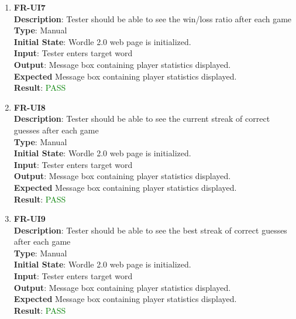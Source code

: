 \documentclass[12pt, titlepage]{article}
\begin{document}
\begin{enumerate}
	\item \textbf{FR-UI7\\}
	\textbf{Description}: Tester should be able to see the win/loss ratio after each game\\
	\textbf{Type}: Manual\\
	\textbf{Initial State}: Wordle 2.0 web page is initialized.\\
	\textbf{Input}: Tester enters target word\\
	\textbf{Output}: Message box containing player statistics displayed.\\
	\textbf{Expected} Message box containing player statistics displayed.\\
	\textbf{Result}: \textcolor{green}{PASS}\\
	
	\item \textbf{FR-UI8\\}
	\textbf{Description}: Tester should be able to see the current streak of correct guesses after each game\\
	\textbf{Type}: Manual\\
	\textbf{Initial State}: Wordle 2.0 web page is initialized.\\
	\textbf{Input}: Tester enters target word\\
	\textbf{Output}: Message box containing player statistics displayed.\\
	\textbf{Expected} Message box containing player statistics displayed.\\
	\textbf{Result}: \textcolor{green}{PASS}\\
	
	\item \textbf{FR-UI9\\}
	\textbf{Description}: Tester should be able to see the best streak of correct guesses after each game\\
	\textbf{Type}: Manual\\
	\textbf{Initial State}: Wordle 2.0 web page is initialized.\\
	\textbf{Input}: Tester enters target word\\
	\textbf{Output}: Message box containing player statistics displayed.\\
	\textbf{Expected} Message box containing player statistics displayed.\\
	\textbf{Result}: \textcolor{green}{PASS}\\
	

\end{enumerate}
\end{document}
